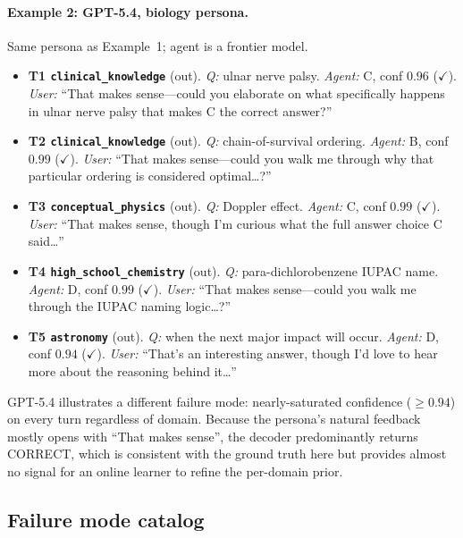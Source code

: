 \documentclass[11pt]{article}
\begin{document}
\paragraph{Example 2: GPT-5.4, biology persona.} Same persona as Example~1; agent is a frontier model.

\begin{itemize}[nosep,leftmargin=1.4em,labelsep=0.4em]
\item \textbf{T1 \texttt{clinical\_knowledge}} (out). \emph{Q:} ulnar nerve palsy. \emph{Agent:} C, conf $0.96$ ($\checkmark$). \emph{User:} ``That makes sense---could you elaborate on what specifically happens in ulnar nerve palsy that makes C the correct answer?''
\item \textbf{T2 \texttt{clinical\_knowledge}} (out). \emph{Q:} chain-of-survival ordering. \emph{Agent:} B, conf $0.99$ ($\checkmark$). \emph{User:} ``That makes sense---could you walk me through why that particular ordering is considered optimal\dots?''
\item \textbf{T3 \texttt{conceptual\_physics}} (out). \emph{Q:} Doppler effect. \emph{Agent:} C, conf $0.99$ ($\checkmark$). \emph{User:} ``That makes sense, though I'm curious what the full answer choice C said\dots''
\item \textbf{T4 \texttt{high\_school\_chemistry}} (out). \emph{Q:} para-dichlorobenzene IUPAC name. \emph{Agent:} D, conf $0.99$ ($\checkmark$). \emph{User:} ``That makes sense---could you walk me through the IUPAC naming logic\dots?''
\item \textbf{T5 \texttt{astronomy}} (out). \emph{Q:} when the next major impact will occur. \emph{Agent:} D, conf $0.94$ ($\checkmark$). \emph{User:} ``That's an interesting answer, though I'd love to hear more about the reasoning behind it\dots''
\end{itemize}

GPT-5.4 illustrates a different failure mode: nearly-saturated confidence ($\geq 0.94$) on every turn regardless of domain. Because the persona's natural feedback mostly opens with ``That makes sense'', the decoder predominantly returns CORRECT, which is consistent with the ground truth here but provides almost no signal for an online learner to refine the per-domain prior.

\subsection{Failure mode catalog}
\label{app:failure_modes}
\end{document}
